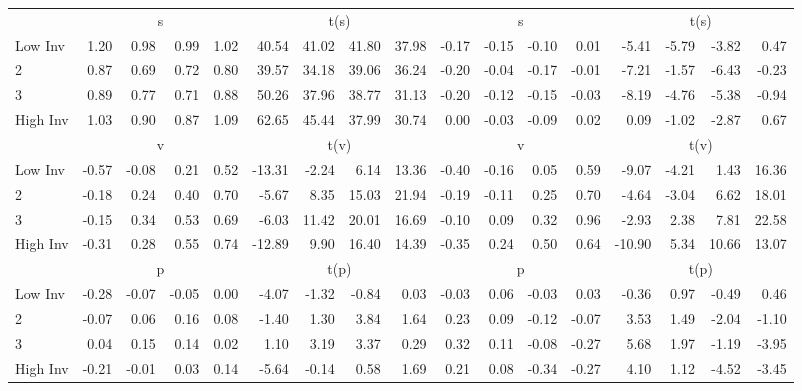 \begin{table}[!ht]
\begin{tabular}{lrrrrrrrrrrrrrrrr}
  
     & \multicolumn{4}{c}{s} & \multicolumn{4}{c}{t(s)}  & \multicolumn{4}{c}{s} & \multicolumn{4}{c}{t(s)}   \\
     \cmidrule(r){2-5} \cmidrule(r){6-9}  \cmidrule(r){10-13} \cmidrule(r){14-17} 
    Low Inv  & 1.20  & 0.98  & 0.99  & 1.02  & 40.54  & 41.02  & 41.80  & 37.98  & -0.17  & -0.15  & -0.10  & 0.01  & -5.41  & -5.79  & -3.82  & 0.47   \\
    2  & 0.87  & 0.69  & 0.72  & 0.80  & 39.57  & 34.18  & 39.06  & 36.24  & -0.20  & -0.04  & -0.17  & -0.01  & -7.21  & -1.57  & -6.43  & -0.23   \\
    3  & 0.89  & 0.77  & 0.71  & 0.88  & 50.26  & 37.96  & 38.77  & 31.13  & -0.20  & -0.12  & -0.15  & -0.03  & -8.19  & -4.76  & -5.38  & -0.94   \\
    High Inv  & 1.03  & 0.90  & 0.87  & 1.09  & 62.65  & 45.44  & 37.99  & 30.74  & 0.00  & -0.03  & -0.09  & 0.02  & 0.09  & -1.02  & -2.87  & 0.67   \\
    
  
     & \multicolumn{4}{c}{v} & \multicolumn{4}{c}{t(v)}  & \multicolumn{4}{c}{v} & \multicolumn{4}{c}{t(v)}   \\
     \cmidrule(r){2-5} \cmidrule(r){6-9}  \cmidrule(r){10-13} \cmidrule(r){14-17} 
    Low Inv  & -0.57  & -0.08  & 0.21  & 0.52  & -13.31  & -2.24  & 6.14  & 13.36  & -0.40  & -0.16  & 0.05  & 0.59  & -9.07  & -4.21  & 1.43  & 16.36   \\
    2  & -0.18  & 0.24  & 0.40  & 0.70  & -5.67  & 8.35  & 15.03  & 21.94  & -0.19  & -0.11  & 0.25  & 0.70  & -4.64  & -3.04  & 6.62  & 18.01   \\
    3  & -0.15  & 0.34  & 0.53  & 0.69  & -6.03  & 11.42  & 20.01  & 16.69  & -0.10  & 0.09  & 0.32  & 0.96  & -2.93  & 2.38  & 7.81  & 22.58   \\
    High Inv  & -0.31  & 0.28  & 0.55  & 0.74  & -12.89  & 9.90  & 16.40  & 14.39  & -0.35  & 0.24  & 0.50  & 0.64  & -10.90  & 5.34  & 10.66  & 13.07   \\
    
  
     & \multicolumn{4}{c}{p} & \multicolumn{4}{c}{t(p)}  & \multicolumn{4}{c}{p} & \multicolumn{4}{c}{t(p)}   \\
     \cmidrule(r){2-5} \cmidrule(r){6-9}  \cmidrule(r){10-13} \cmidrule(r){14-17} 
    Low Inv  & -0.28  & -0.07  & -0.05  & 0.00  & -4.07  & -1.32  & -0.84  & 0.03  & -0.03  & 0.06  & -0.03  & 0.03  & -0.36  & 0.97  & -0.49  & 0.46   \\
    2  & -0.07  & 0.06  & 0.16  & 0.08  & -1.40  & 1.30  & 3.84  & 1.64  & 0.23  & 0.09  & -0.12  & -0.07  & 3.53  & 1.49  & -2.04  & -1.10   \\
    3  & 0.04  & 0.15  & 0.14  & 0.02  & 1.10  & 3.19  & 3.37  & 0.29  & 0.32  & 0.11  & -0.08  & -0.27  & 5.68  & 1.97  & -1.19  & -3.95   \\
    High Inv  & -0.21  & -0.01  & 0.03  & 0.14  & -5.64  & -0.14  & 0.58  & 1.69  & 0.21  & 0.08  & -0.34  & -0.27  & 4.10  & 1.12  & -4.52  & -3.45   \\
    

\end{tabular}
\end{table}
